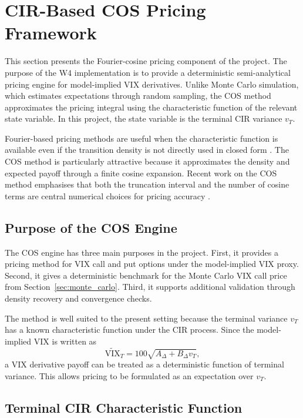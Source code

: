 \section{CIR-Based COS Pricing Framework}
\label{sec:cos_pricing}

This section presents the Fourier-cosine pricing component of the project. The purpose of the W4 implementation is to provide a deterministic semi-analytical pricing engine for model-implied VIX derivatives. Unlike Monte Carlo simulation, which estimates expectations through random sampling, the COS method approximates the pricing integral using the characteristic function of the relevant state variable. In this project, the state variable is the terminal CIR variance \(v_T\).

Fourier-based pricing methods are useful when the characteristic function is available even if the transition density is not directly used in closed form \citep{hirsa2024}. The COS method is particularly attractive because it approximates the density and expected payoff through a finite cosine expansion. Recent work on the COS method emphasises that both the truncation interval and the number of cosine terms are central numerical choices for pricing accuracy \citep{junike2022cos,junike2024cos}.

\subsection{Purpose of the COS Engine}

The COS engine has three main purposes in the project. First, it provides a pricing method for VIX call and put options under the model-implied VIX proxy. Second, it gives a deterministic benchmark for the Monte Carlo VIX call price from Section~\ref{sec:monte_carlo}. Third, it supports additional validation through density recovery and convergence checks.

The method is well suited to the present setting because the terminal variance \(v_T\) has a known characteristic function under the CIR process. Since the model-implied VIX is written as
\begin{equation}
\widetilde{\mathrm{VIX}}_T
=
100\sqrt{A_\Delta+B_\Delta v_T},
\end{equation}
a VIX derivative payoff can be treated as a deterministic function of terminal variance. This allows pricing to be formulated as an expectation over \(v_T\).

\subsection{Terminal CIR Characteristic Function}

